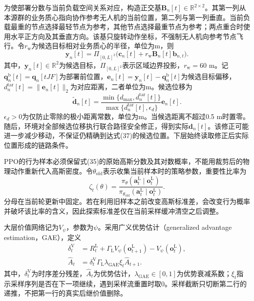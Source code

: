为使部署分数与当前负载空间关系对应，构造正交基$\boldsymbol B_n[t]\in\mathbb{R}^{2\times2}$。其第一列从本源群的业务质心指向协作参考无人机的当前位置，第二列与第一列垂直。当前负载最重的节点选择最轻节点为参考，其他节点选择最重节点为参考；两点重合时使用水平正方向及其垂直方向。该基只旋转动作坐标，不强制无人机向参考节点飞行。令$r_{\mathrm w}$为候选目标相对业务质心的半径，单位为m，则
\[
\boldsymbol y_n[t]=\Pi_{[0,L]^2}
 \big(\boldsymbol c_n[t]+r_{\mathrm w}\boldsymbol B_n[t]\boldsymbol b_{n,t}\big).\tag{37}
\]
其中，$\boldsymbol y_n[t]\in\mathbb{R}^2$为候选目标，$\Pi_{[0,L]^2}$表示区域边界投影，$r_{\mathrm w}=60$ m。记$\boldsymbol q_n^{\mathrm b}[t]=\boldsymbol q_n[tJF]$为部署前位置，$\boldsymbol e_n[t]=\boldsymbol y_n[t]-\boldsymbol q_n^{\mathrm b}[t]$为候选目标偏移，$d_n^{\mathrm{tar}}[t]=\|\boldsymbol e_n[t]\|_2$为对应距离，二者单位为m。候选位移为
\[
\widetilde{\boldsymbol d}_n[t]=
 \frac{\min\{d_{\max},d_n^{\mathrm{tar}}[t]\}}
 {\max\{d_n^{\mathrm{tar}}[t],\epsilon_d\}}\boldsymbol e_n[t].\tag{38}
\]
$\epsilon_d>0$为仅防止零除的极小距离常数，单位为m。当候选距离不超过0.5 m时置零。随后，环境对全部候选位移执行联合路径安全修正，得到实际$\boldsymbol d_n[t]$。该修正可能进一步减少移动，不保证仍精确到达式(37)的候选位置。下层始终读取修正后实际位置形成的链路条件。

PPO的行为样本必须保留式(35)的原始高斯分数及其对数概率，不能用裁剪后的物理动作重新代入高斯密度。令$\theta_{\mathrm{old}}$表示收集当前样本时的策略参数，重要性比率为
\[
\zeta_t(\theta)=
 \frac{\pi_\theta(\boldsymbol a_t^{\mathrm L}\mid\boldsymbol o_t^{\mathrm L})}
 {\pi_{\theta_{\mathrm{old}}}(\boldsymbol a_t^{\mathrm L}\mid\boldsymbol o_t^{\mathrm L})}.\tag{39}
\]
分母在当前轮更新中固定。若在利用旧样本之前改变高斯标准差，会改变行为概率并破坏该比率的含义，因此探索标准差仅在当前采样缓冲清空之后调整。

大层价值网络记为$V_\psi$，参数为$\psi$。采用广义优势估计（generalized advantage estimation，GAE），定义
\[
\begin{aligned}
 \delta_t^{\mathrm V}&=R_t^{\mathrm L}
 +\Gamma_{\mathrm L}V_\psi(\boldsymbol o_{t+1}^{\mathrm L})
 -V_\psi(\boldsymbol o_t^{\mathrm L}),\\
 \widehat A_t&=\delta_t^{\mathrm V}
 \Gamma_{\mathrm L}\lambda_{\mathrm{GAE}}\xi_t\widehat A_{t+1}.
 \end{aligned}\tag{40}
\]
其中，$\delta_t^{\mathrm V}$为时序差分残差，$\widehat A_t$为优势估计，$\lambda_{\mathrm{GAE}}\in[0,1]$为优势衰减系数；$\xi_t$指示采样序列是否在下一项继续，遇到采样流重置时取0。采样截断只切断第二行的递推，不把第一行的真实后继价值删除。

